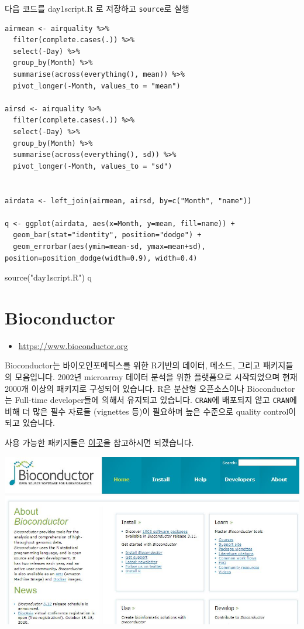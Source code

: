 \documentclass[
]{book}
\newenvironment{Shaded}{\begin{snugshade}}{\end{snugshade}}
\newcommand{\FunctionTok}[1]{\textcolor[rgb]{0.00,0.00,0.00}{#1}}
\newcommand{\NormalTok}[1]{#1}
\newcommand{\StringTok}[1]{\textcolor[rgb]{0.31,0.60,0.02}{#1}}
\providecommand{\tightlist}{%
  \setlength{\itemsep}{0pt}\setlength{\parskip}{0pt}}
\begin{document}
다음 코드를 day1script.R 로 저장하고 \texttt{source}로 실행

\begin{verbatim}
airmean <- airquality %>% 
  filter(complete.cases(.)) %>% 
  select(-Day) %>% 
  group_by(Month) %>% 
  summarise(across(everything(), mean)) %>% 
  pivot_longer(-Month, values_to = "mean")

airsd <- airquality %>% 
  filter(complete.cases(.)) %>% 
  select(-Day) %>% 
  group_by(Month) %>% 
  summarise(across(everything(), sd)) %>% 
  pivot_longer(-Month, values_to = "sd")


airdata <- left_join(airmean, airsd, by=c("Month", "name"))

q <- ggplot(airdata, aes(x=Month, y=mean, fill=name)) +
  geom_bar(stat="identity", position="dodge") +
  geom_errorbar(aes(ymin=mean-sd, ymax=mean+sd), position=position_dodge(width=0.9), width=0.4)
\end{verbatim}

\begin{Shaded}
\begin{Highlighting}[]
\FunctionTok{source}\NormalTok{(}\StringTok{"day1script.R"}\NormalTok{)}
\NormalTok{q}
\end{Highlighting}
\end{Shaded}

\hypertarget{bioconductor}{%
\chapter{Bioconductor}\label{bioconductor}}

\begin{itemize}
\tightlist
\item
  \url{https://www.bioconductor.org}
\end{itemize}

Bioconductor는 바이오인포메틱스를 위한 R기반의 데이터, 메소드, 그리고 패키지들의 모음입니다. 2002년 microarray 데이터 분석을 위한 플랫폼으로 시작되었으며 현재 2000개 이상의 패키지로 구성되어 있습니다. R은 분산형 오픈소스이나 Bioconductor는 Full-time developer들에 의해서 유지되고 있습니다. \texttt{CRAN}에 배포되지 않고 \texttt{CRAN}에 비해 더 많은 필수 자료들 (vignettes 등)이 필요하며 높은 수준으로 quality control이 되고 있습니다.

사용 가능한 패키지들은 \href{http://bioconductor.org/packages/release/BiocViews.html\#___Software}{이곳}을 참고하시면 되겠습니다.

\includegraphics[width=6.25in,height=\textheight]{images/04/bioconductor.JPG}
\end{document}
